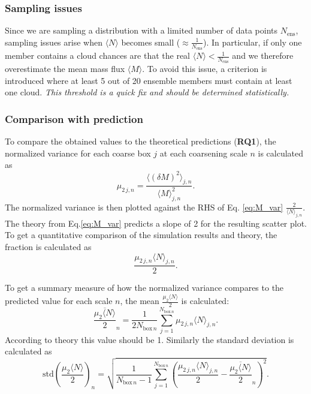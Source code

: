 \documentclass[a4paper, 12pt]{article}
\begin{document}
\subsubsection{Sampling issues}
Since we are sampling a distribution with a limited number of data points $N_{\mathrm{ens}}$, sampling issues arise when $\langle N \rangle$ becomes small ($\approx \frac{1}{N_{\mathrm{ens}}}$). In particular, if only one member contains a cloud chances are that the real $\langle N \rangle < \frac{1}{N_{\mathrm{ens}}}$ and we therefore overestimate the mean mass flux $\langle M \rangle$. To avoid this issue, a criterion is introduced where at least 5 out of 20 ensemble members must contain at least one cloud. \textit{This threshold is a quick fix and should be determined statistically.}

\subsubsection{Comparison with prediction}
To compare the obtained values to the theoretical predictions (\textbf{RQ1}), the normalized variance for each coarse box $j$ at each coarsening scale $n$ is calculated as 
\begin{equation} \label{eq:normalized_variance}
 \mu_{2\,j, n} = \frac{\langle (\delta M )^2 \rangle_{j,n}}{\langle M \rangle_{j,n}^2}.
\end{equation}
The normalized variance is then plotted against the RHS of Eq. \ref{eq:M_var} $\frac{2}{\langle N \rangle_{j,n}}$. The theory from Eq.\ref{eq:M_var} predicts a slope of 2 for the resulting scatter plot. To get a quantitative comparison of the simulation results and theory, the fraction is calculated as
\begin{equation} \label{eq:normalized_variance_fraction}
 \frac{\mu_{2\,j, n} \langle N \rangle_{j,n} }{2}.
\end{equation}

To get a summary measure of how the normalized variance compares to the predicted value for each scale $n$, the mean $\frac{\mu_{2} \langle N \rangle}{2}$ is calculated:
\begin{equation} \label{eq:mean_nvar_n}
 \overline{\frac{\mu_{2}\langle N \rangle}{2}}_n = \frac{1}{2 N_{\mathrm{box}\,n}} \sum_{j=1}^{N_{\mathrm{box}\,n}} \mu_{2\,j,n}\langle N \rangle_{j,n}.
\end{equation}
According to theory this value should be 1. 
Similarly the standard deviation is calculated as
\begin{equation} \label{eq:std_nvar_n}
 \mathrm{std}\left(\frac{\mu_{2}\langle N \rangle}{2}\right)_n = \sqrt{\frac{1}{N_{\mathrm{box}\,n}-1} \sum_{j=1}^{N_{\mathrm{box}\,n}} \left(\frac{\mu_{2\,j, n} \langle N \rangle_{j,n} }{2} - \overline{\frac{\mu_{2}\langle N \rangle}{2}}_n \right)^2}.
\end{equation}
\end{document}
